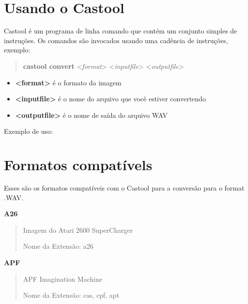 \documentclass[letterpaper,10pt,brazil]{sphinxmanual}
\begin{document}
\section{Usando o Castool}
\label{tools/castool:usando-o-castool}
Castool é um programa de linha comando que contém um conjunto simples de
instruções. Os comandos são invocados usando uma cadência de instruções,
exemplo:
\begin{quote}

\textbf{castool convert} \textless{}\emph{format}\textgreater{} \textless{}\emph{inputfile}\textgreater{} \textless{}\emph{outputfile}\textgreater{}
\end{quote}
\begin{itemize}
\item {} 
\textbf{\textless{}format\textgreater{}} é o formato da imagem

\item {} 
\textbf{\textless{}inputfile\textgreater{}} é o nome do arquivo que você estiver convertendo

\item {} 
\textbf{\textless{}outputfile\textgreater{}} é o nome de saída do arquivo WAV

\end{itemize}

Exemplo de uso:

\begin{DUlineblock}{0em}
\item[] 
\item[] 
\item[] 
\end{DUlineblock}


\section{Formatos compatívels}
\label{tools/castool:formatos-compativels}
Esses são os formatos compatíveis com o Castool para a conversão para
o format .WAV.

\textbf{A26}
\begin{quote}

Imagem do Atari 2600 SuperCharger

Nome da Extensão: a26
\end{quote}

\textbf{APF}
\begin{quote}

APF Imagination Machine

Nome da Extensão: cas, cpf, apt
\end{quote}
\end{document}
